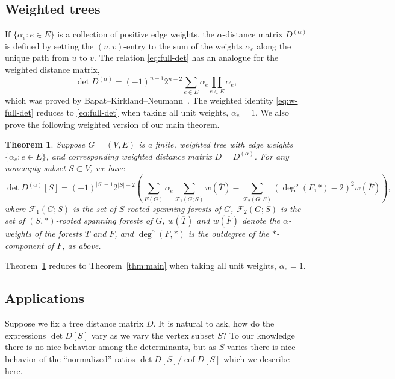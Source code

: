 \documentclass{amsart}
\newtheorem{thm}{Theorem}[section]
\theoremstyle{definition}
\newcommand{\Da}{{D^{(\alpha)}}}
\DeclareMathOperator{\cof}{cof}
\newcommand{\trees}{\mathcal{F}_1}
\newcommand{\forests}{\mathcal{F}}
\newcommand{\degout}{\deg^o}
\begin{document}
\subsection{Weighted trees}
If $\{\alpha_e : e\in E\}$ is a collection of positive edge weights,  the $\alpha$-distance matrix $\Da$ 
is defined by setting the $(u,v)$-entry to the sum of the weights $\alpha_e$ along the unique path from $u$ to $v$.
The relation \eqref{eq:full-det}
has an analogue for the weighted distance matrix, 
\begin{equation}\label{eq:w-full-det}
	\det \Da = (-1)^{n-1} 2^{n-2} \sum_{e \in E} \alpha_e \prod_{e \in E} \alpha_e ,
\end{equation}
which was proved by Bapat--Kirkland--Neumann~\cite{bapat-kirkland-neumann}.
The weighted identity \eqref{eq:w-full-det} reduces to \eqref{eq:full-det} when taking all unit weights, $\alpha_e = 1$.
We also prove the following weighted version of our main theorem.
\begin{thm}
\label{thm:w-main}
Suppose $G = (V,E)$ is a finite, weighted tree with edge weights $\{\alpha_e : e \in E\}$, and corresponding weighted distance matrix $D = \Da$. For any nonempty subset $S \subset V$, we have
\begin{equation}\label{eq:w-main}
	\det \Da[S] = (-1)^{|S|-1} 2^{|S|-2} \left( \sum_{E(G)}\alpha_e \sum_{\trees(G;S)} w(\overline{T}) - \sum_{\forests_2(G;S)} (\degout(F,*) - 2)^2 w(\overline{F}) \right),
\end{equation}
where 
$\trees(G;S)$ is the set of $S$-rooted spanning forests of $G$,
$\forests_2(G;S)$ is the set of $(S,*)$-rooted spanning forests of $G$,
$w(\overline{T})$ and $w(\overline{F})$ denote the $\alpha$-weights of the forests $T$ and $F$,
and 
$\degout(F, *)$ is the outdegree of the $*$-component of $F$, as above.
\end{thm}
Theorem~\ref{thm:w-main} reduces to Theorem~\ref{thm:main} when taking all unit weights, $\alpha_e = 1$.

\subsection{Applications}
Suppose we fix a tree distance matrix $D$.
It is natural to ask, how do the expressions $\det D[S]$ vary as we vary the vertex subset $S$? 
To our knowledge there is no nice behavior among the determinants, but  as $S$ varies there is nice behavior of the ``normalized'' ratios $\det D[S] / \cof D[S]$ which we describe here.
\end{document}
